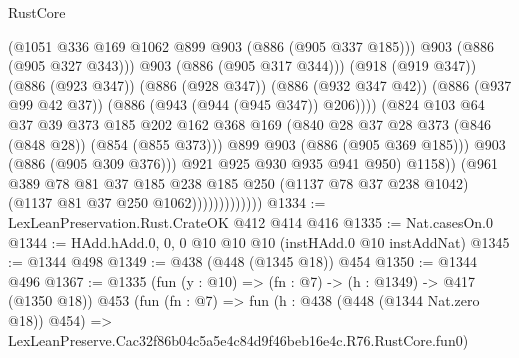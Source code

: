 \begin{lexlean}{RustCore}
\begin{coremodule}
                                          (@1051 @336 @169 @1062 @899 @903 (@886 (@905 @337 @185)))
                                          @903
                                          (@886 (@905 @327 @343)))
                                        @903
                                        (@886 (@905 @317 @344)))
                                      (@918 (@919 @347))
                                      (@886 (@923 @347))
                                      (@886 (@928 @347))
                                      (@886 (@932 @347 @42))
                                      (@886 (@937 @99 @42 @37))
                                      (@886 (@943 (@944 (@945 @347)) @206))))
                                  (@824
                                    @103
                                    @64
                                    @37
                                    @39
                                    @373
                                    @185
                                    @202
                                    @162
                                    @368
                                    @169
                                    (@840 @28 @37 @28 @373 (@846 (@848 @28)) (@854 (@855 @373)))
                                    @899
                                    @903
                                    (@886 (@905 @369 @185)))
                                  @903
                                  (@886 (@905 @309 @376)))
                                @921
                                @925
                                @930
                                @935
                                @941
                                @950)
                              @1158))
                          (@961
                            @389
                            @78
                            @81
                            @37
                            @185
                            @238
                            @185
                            @250
                            (@1137 @78 @37 @238 @1042)
                            (@1137 @81 @37 @250 @1062)))))))))))))
@1334 := LexLeanPreservation.Rust.CrateOK @412 @414 @416
@1335 := Nat.casesOn.{0}
@1344 := HAdd.hAdd.{0, 0, 0} @10 @10 @10 (instHAdd.{0} @10 instAddNat)
@1345 := @1344 @498
@1349 := @438 (@448 (@1345 @18)) @454
@1350 := @1344 @496
@1367 := @1335
    (fun (y : @10) => (fn : @7) -> (h : @1349) -> @417 (@1350 @18))
    @453
    (fun (fn : @7) =>
    fun (h : @438 (@448 (@1344 Nat.zero @18)) @454) =>
    LexLeanPreserve.Cac32f86b04c5a5e4c84d9f46beb16e4c.R76.RustCore.fun0)

\end{coremodule}
\end{lexlean}
